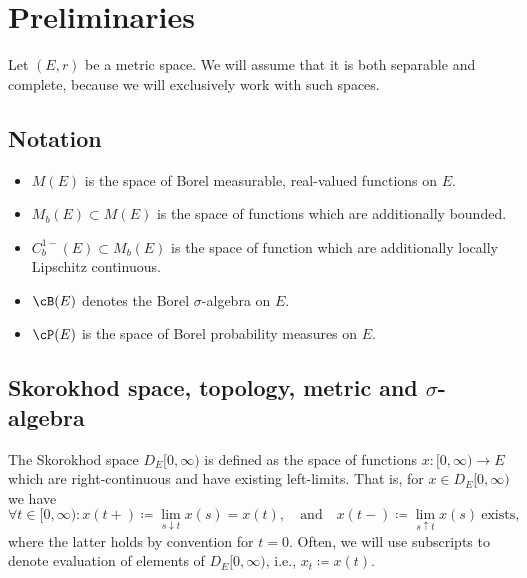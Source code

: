 \section{Preliminaries}

Let $(E,r)$ be a metric space.
We will assume that it is both separable and complete, because we will exclusively work with such spaces.


\subsection{Notation}
\begin{itemize}
  \item $M(E)$ is the space of Borel measurable, real-valued functions on $E$.
  \item $M_b(E) \subset M(E)$ is the space of functions which are additionally bounded.
  \item $C_b^{1-}(E) \subset M_b(E)$ is the space of function which are additionally locally Lipschitz continuous.
  \item $\cB(E)$ denotes the Borel $\sigma$-algebra on $E$.
  \item $\cP(E)$ is the space of Borel probability measures on $E$.
\end{itemize}


\subsection{Skorokhod space, topology, metric and \texorpdfstring{$\sigma$}{sigma}-algebra}
The Skorokhod space $D_E[0,\infty)$ is defined as the space of functions $x : [0,\infty) \to E$ which are right-continuous and have existing left-limits.
That is, for $x \in D_E[0,\infty)$ we have
\begin{equation}
  \forall t \in [0,\infty) : x(t+) \coloneqq \lim_{s \downarrow t} x(s) = x(t), \quad\text{and}\quad x(t-) \coloneqq \lim_{s \uparrow t} x(s)\ \text{exists},
\end{equation}
where the latter holds by convention for $t = 0$.
Often, we will use subscripts to denote evaluation of elements of $D_E[0,\infty)$, i.e., $x_t \coloneqq x(t)$.

